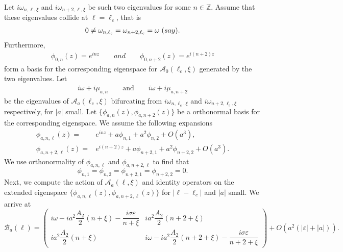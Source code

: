 \documentclass[12pt]{amsart}    %
\newcommand{\Z}{\mathbb{Z}}
\numberwithin{equation}{section}
\begin{document}
Let $i\omega_{n,\ell,\xi}$ and $i\omega_{n+2,\ell,\xi}$ be such two eigenvalues for some $n\in \Z$. Assume that these eigenvalues collide at $\ell=\ell_c$, that is
\begin{align}
     0 \neq \omega_{n,\ell_c} = \omega_{n+2,\ell_c} = \omega \hspace{3px} (say).
\end{align}
Furthermore,
\begin{align}
 \phi_{0,n}(z) = e^{i n z}
 \quad \quad and \quad\quad
 \phi_{0,n+2}(z) = e^{i (n+2) z}
\end{align}
form a basis for the corresponding eigenspace for $\mathcal{A}_0(\ell_c,\xi)$ generated by the two eigenvalues. 
Let
\begin{align}
    i \omega + i \mu_{a,n}
    \quad \quad \text{and} \quad\quad
    i \omega + i \mu_{a,n+2}
\end{align}
be the eigenvalues of $\mathcal{A}_a(\ell_c,\xi)$ bifurcating from $i\omega_{n,\ell_c,\xi}$ and $i\omega_{n+2,\ell_c,\xi}$ respectively, for $|a|$ small. Let $\{\phi_{a,n}(z), \phi_{a,n+2}(z)\}$ be a orthonormal basis for the corresponding eigenspace. We assume the following expansions 
\begin{align}\label{eq:eiggg1}
    \phi_{a,n,\ell}(z) =& e^{inz}+a\phi_{n,1}+a^2\phi_{n,2}+O(a^3), \\
    \phi_{a,n+2,\ell}(z) =& e^{i(n+2)z}+a\phi_{n+2,1}+a^2\phi_{n+2,2}
      +O(a^3).\label{eq:eiggg2}
\end{align}
We use orthonormality of $\phi_{a,n,\ell}$ and $\phi_{a,n+2,\ell}$ to find that
\[
\phi_{n,1} = \phi_{n,2} = \phi_{n+2,1} = \phi_{n+2,2} = 0.
\]
Next, we compute the action of $\mathcal{A}_a(\ell,\xi)$ and identity operators on the extended eigenspace $\{\phi_{a,n,\ell}(z), \phi_{a,n+2,\ell}(z)\}$ for $|\ell - \ell_c|$ and $|a|$ small. We arrive at
\begin{equation*}
    \mathcal B_a(\ell) = \begin{pmatrix} i\omega-ia^2\dfrac{A_2}{2}(n+\xi)-\dfrac{i\sigma \varepsilon}{n+\xi} & ia^2\dfrac{A_2}{2}(n+2+\xi) \\ ia^2\dfrac{A_2}{2}(n+\xi) & i\omega-ia^2\dfrac{A_2}{2}(n+2+\xi)-\dfrac{i\sigma \varepsilon}{n+2+\xi}
    \end{pmatrix} + O(a^2(|\varepsilon|+|a|)).
\end{equation*}
\end{document}
